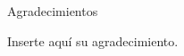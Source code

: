 \documentclass[12pt,papel,oneside]{ibtesis}
\begin{document}
\begin{biblio}

\end{biblio}


\begin{postliminary}

\listoffigures                  %

\listoftables                   %






\begin{seccion}{Agradecimientos}
\begin{small}	

Inserte aquí su agradecimiento.

\end{small}


\end{seccion}



\end{postliminary}
\end{document}
